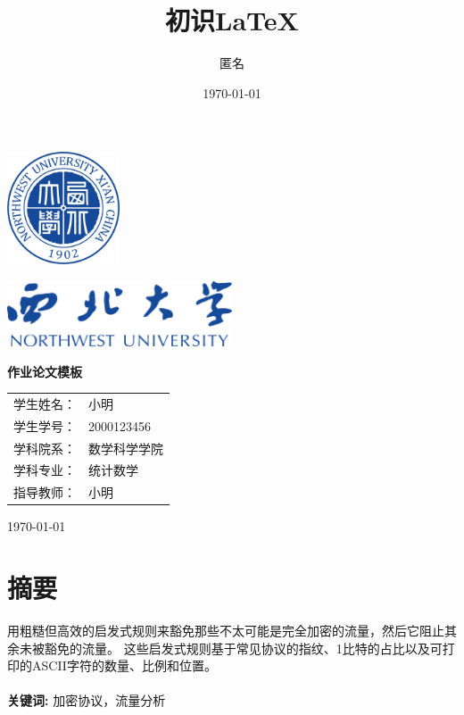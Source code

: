 \documentclass[12pt, a4paper, oneside, UTF8]{ctexart}
\title{初识\LaTeX}
\author{匿名}
\date{\today}
\begin{document}
\begin{titlepage}
    \centering
    \vspace*{1cm}
    \includegraphics[width=0.25\textwidth]{logo.png} %
    \vspace{1cm}

    \includegraphics[width=0.5\textwidth]{name.png} %
    \vspace{1cm}

    \huge\textbf{作业论文模板}
    \vspace{1.5cm}

    \Large
    \begin{tabular}{rl}
        \large 学生姓名： & \large 小明 \\
        \large 学生学号： & \large 2000123456 \\                            
        \large 学科院系： & \large 数学科学学院 \\
        \large 学科专业： & \large 统计数学 \\
        \large 指导教师： & \large 小明 \\
    \end{tabular}
    \vfill

    \large{\today}
\end{titlepage}

\section*{摘要} %
用粗糙但高效的启发式规则来豁免那些不太可能是完全加密的流量，然后它阻止其余未被豁免的流量。
这些启发式规则基于常见协议的指纹、1比特的占比以及可打印的ASCII字符的数量、比例和位置。\\ \\
\noindent \textbf{关键词:} 加密协议，流量分析
\end{document}
